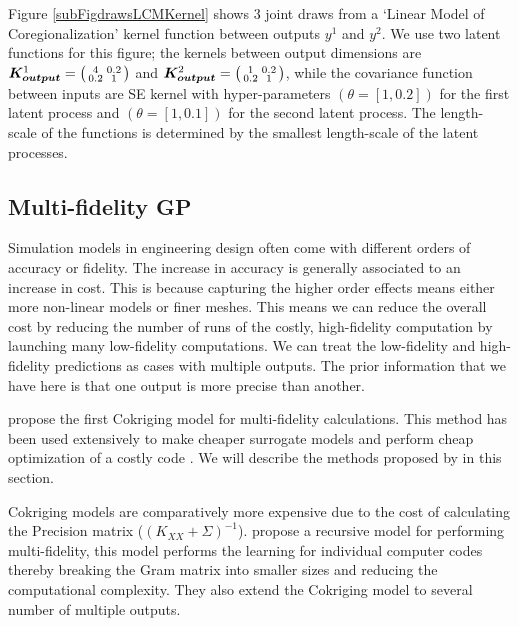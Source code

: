 Figure \ref{subFigdrawsLCMKernel} shows 3 joint draws from a `Linear Model of Coregionalization' kernel function between outputs $y^{1}$ and $y^{2}$. We use two latent functions for this figure; the kernels between output dimensions are $\boldsymbol{K_{output}}^{1} = \bigl( \begin{smallmatrix} 4 & 0.2\\ 0.2 & 1\end{smallmatrix}\bigr)$ and $\boldsymbol{K_{output}}^{2} = \bigl( \begin{smallmatrix} 1 & 0.2\\ 0.2 & 1\end{smallmatrix}\bigr)$, while the covariance function between inputs are SE kernel with hyper-parameters $(\theta = [1, 0.2])$ for the first latent process and $(\theta = [1, 0.1])$ for the second latent process. The length-scale of the functions is determined by the smallest length-scale of the latent processes.

\subsection{Multi-fidelity GP}\label{secMultiFidelityMTGP}
Simulation models in engineering design often come with different orders of accuracy or fidelity. The increase in accuracy is generally associated to an increase in cost. This is because capturing the higher order effects means either more non-linear models or finer meshes. This means we can reduce the overall cost by reducing the number of runs of the costly, high-fidelity computation by launching many low-fidelity computations. We can treat the low-fidelity and high-fidelity predictions as cases with multiple outputs. The prior information that we have here is that one output is more precise than another. 

\cite{kennedy2000predicting, o1998markov} propose the first Cokriging model for multi-fidelity calculations. This method has been used extensively to make cheaper surrogate models and perform cheap optimization of a costly code \cite{forrester2007multi, march2012provably}. We will describe the methods proposed by \cite{o1998markov} in this section. 


Cokriging models are comparatively more expensive due to the cost of calculating the Precision matrix ($(K_{XX} + \Sigma)^{-1}$). \cite{le2013multi} propose a recursive model for performing multi-fidelity, this model performs the learning for individual computer codes thereby breaking the Gram matrix into smaller sizes and reducing the computational complexity. They also extend the Cokriging model to several number of multiple outputs.

